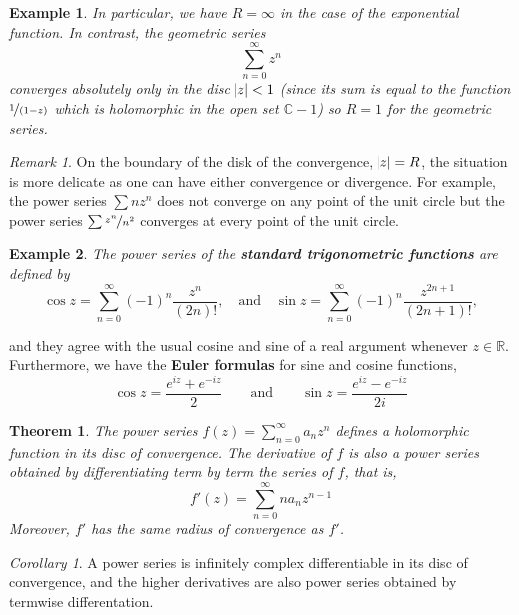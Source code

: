 \documentclass{article}
\newtheorem{theorem}{Theorem}
\newtheorem*{example}{Example}
\theoremstyle{definition}
\theoremstyle{remark}
\newtheorem*{remark}{Remark}
\newtheorem{corollary}{Corollary}[theorem]
\begin{document}
    \begin{example}
        In particular, we have $R=\infty$ in the case of the exponential function. In contrast, the geometric series
        \[ \sum_{n=0}^{\infty} z^n \]
        converges absolutely only in the disc $\abs{z}<1$ (since its sum is equal to the function $\nicefrac{1}{(1-z)}$ which is
        holomorphic in the open set $\mathbb{C}-1$) so $R = 1$ for the geometric series.
    \end{example}

    \begin{remark}
        On the boundary of the disk of the convergence, $\abs{z}=R$, the situation is more delicate as one can have either
        convergence or divergence. For example, the power series $\sum nz^n$ does not converge on any point of the unit circle
        but the power series $\sum \nicefrac{z^n}{n^2}$ converges at every point of the unit circle.
    \end{remark}

    \begin{example}
        The power series of the \textbf{standard trigonometric functions} are defined by
        \[ \cos{z} = \sum_{n=0}^{\infty} (-1)^n\frac{z^n}{(2n)!},\quad\text{and}\quad\sin{z} = 
            \sum_{n=0}^{\infty}(-1)^n\frac{z^{2n+1}}{(2n+1)!}, \]
    \end{example}
    and they agree with the usual cosine and sine of a real argument whenever $z\in\mathbb{R}$. Furthermore, we have the 
    \textbf{Euler formulas} for sine and cosine functions,
    \[ \cos{z} = \frac{e^{iz} + e^{-iz}}{2}\qquad\text{and}\qquad\sin{z} = \frac{e^{iz}-e^{-iz}}{2i} \]

    \begin{theorem}
        The power series $f(z) = \sum_{n=0}^{\infty} a_nz^n$ defines a holomorphic function in its disc of convergence. The derivative
        of $f$ is also a power series obtained by differentiating term by term the series of $f$, that is,
        \[ f'(z) = \sum_{n=0}^{\infty} na_nz^{n-1} \]
        Moreover, $f'$ has the same radius of convergence as $f'$.
    \end{theorem}

    \begin{corollary}
        A power series is infinitely complex differentiable in its disc of convergence, and the higher derivatives are also power series
        obtained by termwise differentation.
    \end{corollary}
\end{document}
